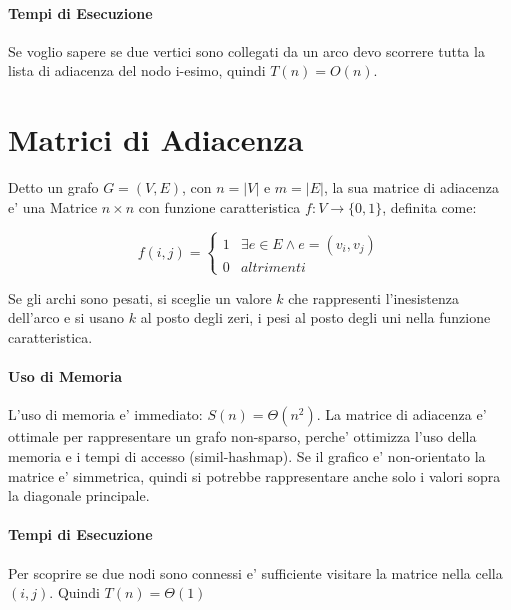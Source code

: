 \paragraph{Tempi di Esecuzione}

Se voglio sapere se due vertici sono collegati da un arco devo scorrere tutta la lista di adiacenza del nodo i-esimo, quindi $T(n) = O(n)$.

\section{Matrici di Adiacenza}

Detto un grafo $G = (V, E)$, con $n = |V|$ e $m = |E|$, la sua matrice di adiacenza e' una Matrice $n \times n$ con funzione caratteristica $f : V \rightarrow \{0,1\}$, definita come:

\[
    f(i, j) = 
    \begin{cases}
        1 & \exists e \in E \land e = (v_{i}, v_{j}) \\
        0 & altrimenti
    \end{cases}
\]

Se gli archi sono pesati, si sceglie un valore $k$ che rappresenti l'inesistenza dell'arco e si usano $k$ al posto degli zeri, i pesi al posto degli uni nella funzione caratteristica.

\paragraph{Uso di Memoria}

L'uso di memoria e' immediato: $S(n) = \Theta(n^2)$.
La matrice di adiacenza e' ottimale per rappresentare un grafo non-sparso, perche' ottimizza l'uso della memoria e i tempi di accesso (simil-hashmap).
Se il grafico e' non-orientato la matrice e' simmetrica, quindi si potrebbe rappresentare anche solo i valori sopra la diagonale principale.

\paragraph{Tempi di Esecuzione}

Per scoprire se due nodi sono connessi e' sufficiente visitare la matrice nella cella $(i, j)$. Quindi $T(n) = \Theta(1)$

